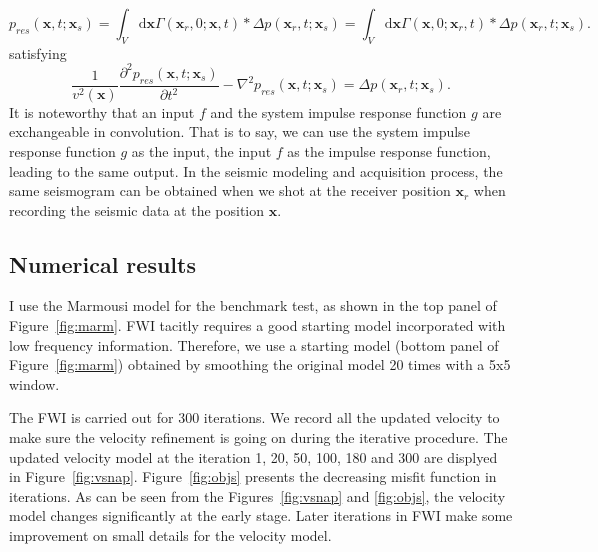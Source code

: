 \begin{equation} 
p_{res}(\textbf{x},t;\textbf{x}_s)
=\int_V \mathrm{d}\textbf{x}\Gamma(\textbf{x}_r,0;\textbf{x},t)*\Delta p(\textbf{x}_r,t;\textbf{x}_s)
=\int_V \mathrm{d}\textbf{x}\Gamma(\textbf{x},0;\textbf{x}_r,t)*\Delta p(\textbf{x}_r,t;\textbf{x}_s).
\end{equation}
satisfying
\begin{equation}
\frac{1}{v^2(\textbf{x})}\frac{\partial^2 p_{res}(\textbf{x},t;\textbf{x}_s)}{\partial t^2}-\nabla^2 p_{res}(\textbf{x},t;\textbf{x}_s)=\Delta p(\textbf{x}_r,t;\textbf{x}_s).
\end{equation}
It is noteworthy that an input $f$ and the system impulse response function  $g$ are exchangeable in convolution. That is to say, we can use the system impulse response function $g$ as the input, the input $f$ as the impulse response function, leading to the same output. In the seismic modeling and acquisition process, the same seismogram can be obtained when we shot at the receiver position $\textbf{x}_r$ when recording the seismic data at the position $\textbf{x}$.

\subsection{Numerical results}

I use the Marmousi model for the benchmark test, as shown in the top panel of Figure~\ref{fig:marm}.
FWI tacitly requires a good starting model incorporated with low frequency information. Therefore, we use a starting model (bottom panel of Figure~\ref{fig:marm}) obtained by smoothing the original model 20 times with a 5x5 window.

The FWI is carried out for 300 iterations. We record all the updated velocity to make sure the velocity refinement is going on during the iterative procedure. The updated velocity model at the iteration 1, 20, 50, 100, 180 and 300 are displyed in Figure~\ref{fig:vsnap}. Figure~\ref{fig:objs} presents the decreasing misfit function in iterations. As can be seen from the Figures~\ref{fig:vsnap} and \ref{fig:objs}, the velocity model changes significantly at the early stage. Later iterations in FWI make some improvement on small details for the velocity model.





